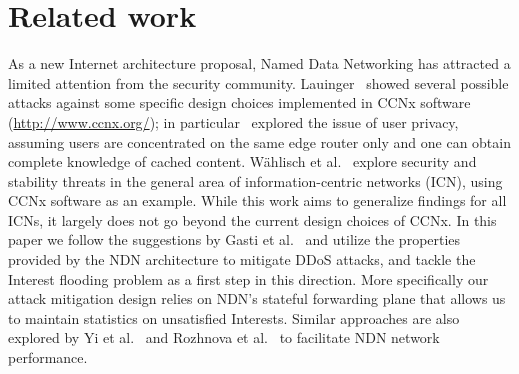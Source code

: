 \documentclass[10pt,conference]{IEEEtran}
\begin{document}
{\section{Related work}
\label{sec:related-work}

As a new Internet architecture proposal, Named Data Networking has attracted a limited attention from the security community. 
Lauinger~\cite{Lauinger:2010:Security--scalability} showed several possible attacks against some specific design choices implemented in CCNx software (\url{http://www.ccnx.org/}); in particular~\cite{Lauinger:2010:Security--scalability} explored the issue of user privacy, assuming users are concentrated on the same edge router only and one can obtain complete knowledge of cached content.  
W\"ahlisch et al.~\cite{Wahlisch:2012:Backscatter-from} explore security and stability threats in the general area of information-centric networks (ICN), using CCNx software as an example.  
While this work aims to generalize findings for all ICNs, it largely does not go beyond the current design choices of CCNx.
In this paper we follow the suggestions by Gasti et al.~\cite{gasti2012ddos} and utilize the properties provided by the NDN architecture to mitigate DDoS attacks, and tackle the Interest flooding problem as a first step in this direction.
More specifically our attack mitigation design relies on NDN's stateful forwarding plane that allows us to
maintain statistics on unsatisfied Interests.  
Similar approaches are also explored by Yi et al.~\cite{adaptive-forwarding,adaptive-tr,Yi:2013:A-Case-for-Stateful} and Rozhnova et al.~\cite{rozhnova2012effective} to facilitate NDN network performance.

}
\end{document}
